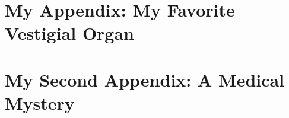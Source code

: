 \documentclass[capstoc,capschap]{rpisudiss}
\begin{document}
\frontmatter

\tableofcontents

\mainmatter %

\appendix

\chapter{My Appendix: My Favorite Vestigial Organ}
\blindtext

\chapter{My Second Appendix: A Medical Mystery}
\blindtext
\end{document}
